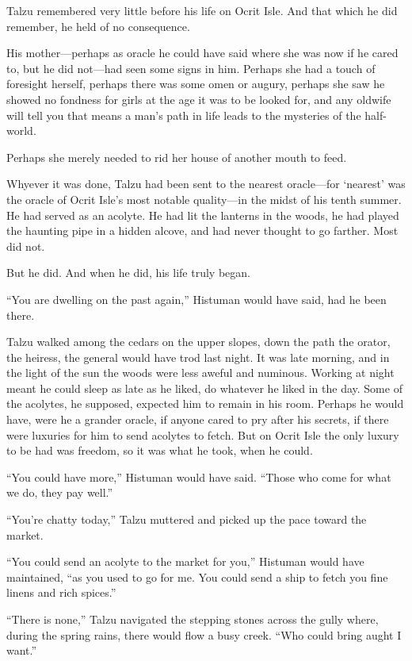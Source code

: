 \secdiv

\noindent Talzu remembered very little before his life on Ocrit Isle. And that which he did remember, he held of no consequence.

His mother---perhaps as oracle he could have said where she was now if he cared to, but he did not---had seen some signs in him. Perhaps she had a touch of foresight herself, perhaps there was some omen or augury, perhaps she saw he showed no fondness for girls at the age it was to be looked for, and any oldwife will tell you that means a man's path in life leads to the mysteries of the half-world.

Perhaps she merely needed to rid her house of another mouth to feed.

Whyever it was done, Talzu had been sent to the nearest oracle---for `nearest' was the oracle of Ocrit Isle's most notable quality---in the midst of his tenth summer. He had served as an acolyte. He had lit the lanterns in the woods, he had played the haunting pipe in a hidden alcove, and had never thought to go farther. Most did not.

But he did. And when he did, his life truly began.

\secdiv

\noindent ``You are dwelling on the past again,'' Histuman would have said, had he been there.

Talzu walked among the cedars on the upper slopes, down the path the orator, the heiress, the general would have trod last night. It was late morning, and in the light of the sun the woods were less aweful and numinous. Working at night meant he could sleep as late as he liked, do whatever he liked in the day. Some of the acolytes, he supposed, expected him to remain in his room. Perhaps he would have, were he a grander oracle, if anyone cared to pry after his secrets, if there were luxuries for him to send acolytes to fetch. But on Ocrit Isle the only luxury to be had was freedom, so it was what he took, when he could.

``You could have more,'' Histuman would have said. ``Those who come for what we do, they pay well.''

``You're chatty today,'' Talzu muttered and picked up the pace toward the market.

``You could send an acolyte to the market for you,'' Histuman would have maintained, ``as you used to go for me. You could send a ship to fetch you fine linens and rich spices.''

``There is none,'' Talzu navigated the stepping stones across the gully where, during the spring rains, there would flow a busy creek. ``Who could bring aught I want.''

